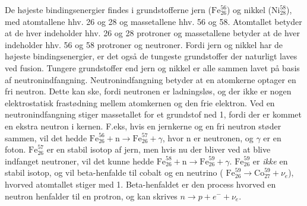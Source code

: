 \documentclass[twocolumn]{article}
\begin{document}
De højeste bindingsenergier findes i grundstofferne jern ($\mathrm{Fe}_{26}^{56}$) og nikkel ($\mathrm{Ni}_{28}^{58}$), med atomtallene hhv. 26 og 28 og massetallene hhv. 56 og 58. Atomtallet betyder at de hver indeholder hhv. 26 og 28 protroner og massetallene betyder at de hver indeholder hhv. 56 og 58 protroner og neutroner. Fordi jern og nikkel har de højeste bindingsenergier, er det også de tungeste grundstoffer der naturligt laves ved fusion. Tungere grundstoffer end jern og nikkel er alle sammen lavet på basis af neutronindfangning. Neutronindfangning betyder at en atomkerne optager en fri neutron. Dette kan ske, fordi neutronen er ladningsløs, og der ikke er nogen elektrostatisk frastødning mellem atomkernen og den frie elektron. Ved en neutronindfangning stiger massetallet for et grundstof ned 1, fordi der er kommet en ekstra neutron i kernen. F.eks, hvis en jernkerne og en fri neutron støder sammen, vil det hedde $\mathrm{Fe}_{26}^{56} + \mathrm{n} \rightarrow \mathrm{Fe}_{26}^{57} + \gamma$, hvor n er neutronen, og $\gamma$ er en foton. $\mathrm{Fe}_{26}^{57}$ er en stabil isotop af jern, men hvis nu der bliver ved at blive indfanget neutroner, vil det kunne hedde $\mathrm{Fe}_{26}^{58} + \mathrm{n} \rightarrow \mathrm{Fe}_{26}^{59} + \gamma$. $\mathrm{Fe}_{26}^{59}$ er \textit{ikke} en stabil isotop, og vil beta-henfalde til cobalt og en neutrino ( $\mathrm{Fe}_{26}^{59} \rightarrow  \mathrm{Co}_{27}^{59} + \nu_e$), hvorved atomtallet stiger med 1. Beta-henfaldet er den process hvorved en neutron henfalder til en protron, og kan skrives $n \rightarrow p + e^- + \nu_e$. 
\end{document}
